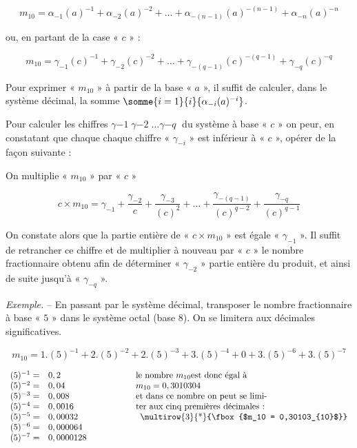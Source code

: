 \[ m_{10} =  \alpha_{-1}(a)^{-1} +  \alpha_{-2}(a)^{-2} +  \ldots + \alpha_{-(n-1)}(a)^{-(n-1)} +  \alpha_{-n}(a)^{-n} \]

ou, en partant de la case « $c$ » :

\[ m_{10} =  \gamma_{-1}(c)^{-1} +  \gamma_{-2}(c)^{-2} +  \ldots + \gamma_{-(q-1)}(c)^{-(q-1)} +  \gamma_{-q}(c)^{-q} \]

Pour exprimer « $m_{10}$ » à partir de la base  « $a$ », il suffit de calculer, dans le système décimal, la somme  $\somme{i=1}{i}{\alpha_{-i}(a)^{-i}}$.

Pour calculer les chiffres $\gamma{-1}\; \gamma{-2}\; \ldots \gamma{-q}\;  $ du système à base « $c$ » on peur, en constatant  
que chaque chaque chiffre « $\gamma_{-i}$ » est inférieur à « $c$ », opérer de la façon suivante : 

On multiplie « $m_{10}$ »  par « $c$ » 

\[ c \times m_{10} = \gamma_{-1} + \dfrac{\gamma_{-2}}{c} +   \dfrac{\gamma_{-3}}{(c)^2}  +   \ldots + \dfrac{\gamma_{-(q-1)}}{(c)^{q-2}} +   \dfrac{\gamma_{-q}}{(c)^{q-1}}  \]

On constate alors que la partie entière de « $c\times m_{10}$ » est égale « $\gamma_{-1}$ ». Il suffit de retrancher ce chiffre et de multiplier à nouveau par « $c$ » le nombre fractionnaire obtenu afin de déterminer « $\gamma_{-2}$ » partie entière du produit, et ainsi de suite jusqu'à « $\gamma_{-q}$ ».

\textsl{Exemple.} -- En passant par le système décimal, transposer le nombre fractionnaire à base  « $5$ »  dans le système octal (base 8). On se limitera aux décimales significatives. 

\[ m_{10} = 1 . (5)^{-1} + 2 . (5)^{-2} + 2 . (5)^{-3} + 3 . (5)^{-4} + 0 + 3 . (5)^{-6} + 3 . (5)^{-7} \] 

\[
\begin{array}{rl@{\hspace*{2cm}}l}
     (5)^{-1} = & 0,2         & \text{le nombre } m_{10} \text{est donc égal à} \\ 
     (5)^{-2} = & 0,04        &  m_{10} = 0,3010304 \\ 
     (5)^{-3} = & 0,008       & \text{et dans ce nombre on peut se limi-} \\ 
     (5)^{-4} = & 0,0016      & \text{ter aux cinq premières décimales : } \\ 
     (5)^{-5} = & 0,00032     & \multicolumn{1}{c}{$\multirow{3}{*}{\fbox{$m_10 = 0,30103_{10}$}}$}  \\ 
     (5)^{-6} = & 0,000064    &   \\ 
     (5)^{-7} = & 0,0000128   &   \\ 
\end{array}
\]

